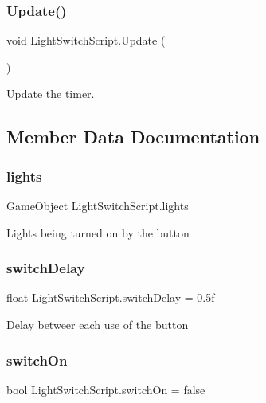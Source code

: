 \subsubsection{\texorpdfstring{Update()}{Update()}}
{\footnotesize\ttfamily void Light\+Switch\+Script.\+Update (\begin{DoxyParamCaption}{ }\end{DoxyParamCaption})\hspace{0.3cm}{\ttfamily [private]}}



Update the timer. 



\subsection{Member Data Documentation}
\mbox{\label{class_light_switch_script_af694bcbddc86da2b19ec1a1e718a524e}} 
\subsubsection{\texorpdfstring{lights}{lights}}
{\footnotesize\ttfamily Game\+Object Light\+Switch\+Script.\+lights}

Lights being turned on by the button \mbox{\label{class_light_switch_script_a2924fa9a2279417a792949e92fb8d3a8}} 
\subsubsection{\texorpdfstring{switchDelay}{switchDelay}}
{\footnotesize\ttfamily float Light\+Switch\+Script.\+switch\+Delay = 0.\+5f\hspace{0.3cm}{\ttfamily [private]}}

Delay betweer each use of the button \mbox{\label{class_light_switch_script_a913b341df9242c9626813c69942ab4e2}} 
\subsubsection{\texorpdfstring{switchOn}{switchOn}}
{\footnotesize\ttfamily bool Light\+Switch\+Script.\+switch\+On = false\hspace{0.3cm}{\ttfamily [private]}}

